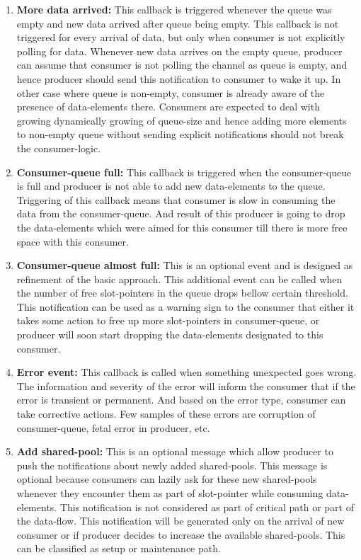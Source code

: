 \documentclass[a4paper,twoside]{report} %
\begin{document}
\begin{enumerate} 
  \item \textbf{More data arrived:} This callback is triggered
  whenever the queue was empty and new data arrived after queue being
  empty.  This callback is not triggered for every arrival of data,
  but only when consumer is not explicitly polling for data.  Whenever
  new data arrives on the empty queue, producer can assume that
  consumer is not polling the channel as queue is empty, and hence
  producer should send this notification to consumer to wake it up.
  In other case where queue is non-empty, consumer is already aware of
  the presence of data-elements there.  Consumers are expected to
  deal with growing dynamically growing of queue-size and hence adding
  more elements to non-empty queue without sending explicit
  notifications should not break the consumer-logic.

  \item \textbf{Consumer-queue full:}  This callback is triggered when
  the consumer-queue is full and producer is not able to add new
  data-elements to the queue.  Triggering of this callback means that
  consumer is slow in consuming the data from the consumer-queue. And
  result of this producer is going to drop the data-elements which
  were aimed for this consumer till there is more free space with this
  consumer.  
 
  \item \textbf{Consumer-queue almost full:} This is an optional
  event and is designed as refinement of the basic approach.
  This additional event can be 
  called when the number of free slot-pointers in the queue drops bellow
  certain threshold.  This notification can be used as a warning sign
  to the consumer that either it takes some action to free up more
  slot-pointers in consumer-queue, or producer will soon start dropping the
  data-elements designated to this consumer.

  \item \textbf{Error event:}  This callback is called when something
  unexpected goes wrong.  The information and severity of the error
  will inform the consumer that if the error is transient or
  permanent.  And based on the error type, consumer can take
  corrective actions.  Few samples of these errors are corruption of
  consumer-queue, fetal error in producer, etc.

  \item \textbf{Add shared-pool:}  This is an optional message which
  allow producer to push the notifications about newly added
  shared-pools.  This message is optional because consumers
  can lazily ask for these new shared-pools whenever they 
  encounter them as part of slot-pointer while consuming
  data-elements.  This notification is not considered as part of
  critical path or part of the data-flow.  This notification will be
  generated only on the arrival of new consumer or if producer decides
  to increase the available shared-pools.  This can be classified as
  setup or maintenance path.


\end{enumerate}
\end{document}
